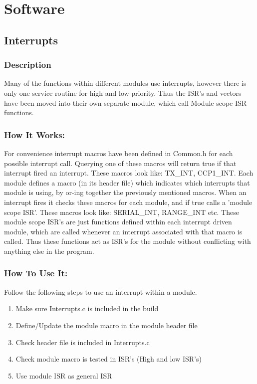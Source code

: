 \documentclass[]{report}
\begin{document}
\part{Software}

\chapter{Interrupts}
\section{Description}
Many of the functions within different modules use interrupts, however there is only one service routine for high and low priority. Thus the ISR's and vectors have been moved into their own separate module, which call Module scope ISR functions.

\section{How It Works:}
For convenience interrupt macros have been defined in Common.h for each possible interrupt call. Querying one of these macros will return true if that interrupt fired an interrupt. These macros look like: TX\_INT, CCP1\_INT.\newline
Each module defines a macro (in its header file) which indicates which interrupts that module is using, by or-ing together the previously mentioned macros. When an interrupt fires it checks these macros for each module, and if true calls a 'module scope ISR'. These macros look like: SERIAL\_INT, RANGE\_INT etc. \newline
These module scope ISR's are just functions defined within each interrupt driven module, which are called whenever an interrupt associated with that macro is called. Thus these functions act as ISR's for the module without conflicting with anything else in the program.

\section{How To Use It:}
Follow the following steps to use an interrupt within a module.
\begin{enumerate}
	\item Make sure Interrupts.c is included in the build
	\item Define/Update the module macro in the module header file
	\item Check header file is included in Interrupts.c
	\item Check module macro is tested in ISR's (High and low ISR's)
	\item Use module ISR as general ISR
\end{enumerate}
\end{document}
